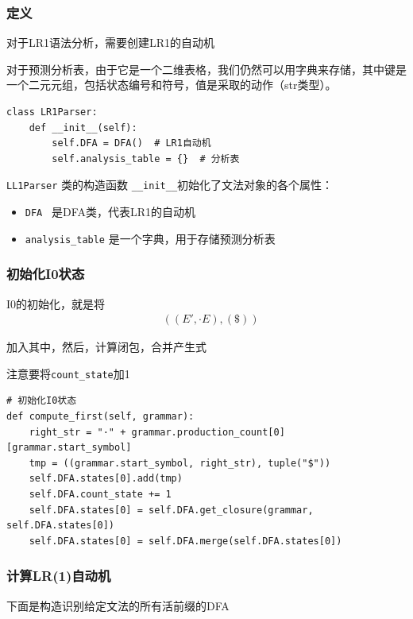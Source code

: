 \documentclass[lang=cn,11pt,a4paper]{elegantpaper}
\begin{document}
\subsubsection{定义}

对于LR1语法分析，需要创建LR1的自动机

对于预测分析表，由于它是一个二维表格，我们仍然可以用字典来存储，其中键是一个二元元组，包括状态编号和符号，值是采取的动作（str类型）。

\begin{lstlisting}
class LR1Parser:
    def __init__(self):
        self.DFA = DFA()  # LR1自动机
        self.analysis_table = {}  # 分析表
\end{lstlisting}

\lstinline{LL1Parser} 类的构造函数 \lstinline{__init__}初始化了文法对象的各个属性：
\begin{itemize}
    \item \lstinline{DFA } 是DFA类，代表LR1的自动机
    \item \lstinline{analysis_table} 是一个字典，用于存储预测分析表
\end{itemize}

\subsubsection{初始化I0状态}

I0的初始化，就是将
$$
\begin{aligned}
& ((E', \cdot E), (\$))
\end{aligned}
$$

加入其中，然后，计算闭包，合并产生式

注意要将\lstinline{count_state}加1

\begin{lstlisting}
# 初始化I0状态
def compute_first(self, grammar):
    right_str = "·" + grammar.production_count[0][grammar.start_symbol]
    tmp = ((grammar.start_symbol, right_str), tuple("$"))
    self.DFA.states[0].add(tmp)
    self.DFA.count_state += 1
    self.DFA.states[0] = self.DFA.get_closure(grammar, self.DFA.states[0])
    self.DFA.states[0] = self.DFA.merge(self.DFA.states[0])
\end{lstlisting}

\subsubsection{计算LR(1)自动机}

下面是构造识别给定文法的所有活前缀的DFA
\end{document}

